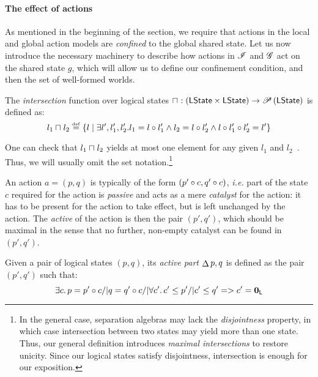 \paragraph{The effect of actions} As mentioned in the beginning of the
section, we require that actions in the local and global action models
are \emph{confined} to the global shared state.  Let us now introduce
the necessary machinery to describe how actions in $\mathscr{I}$ and $\mathscr{G}$
act on the shared state $g$, which will allow us to define our
confinement condition, and then the set of well-formed worlds.

\begin{definition}[Intersection]
The \emph{intersection} function over logical states 
$
\sqcap_{} : \left(\textsf{LState} \times \textsf{LState} \right) \rightarrow \mathscr{P}\left(\textsf{LState} \right)
$
is defined as:
\[
l_1 \sqcap_{} l_2 \mathrel{\stackrel{\smash{\scriptscriptstyle{\mathrm{def}}}}{=}} 
\left\{ 
l  \mid
\exists l', l_1', l_2'.\,\! l_1 = l \circ l_1' \land l_2 = l \circ l_2' \land l \circ l_1' \circ l_2' = l'
\right\}
\]
\end{definition}

One can check that $l_1\sqcap_{} l_2$ yields at most one element for any
given $l_1$ and $l_2$~\cite{colosl-tr14}. Thus, we will usually omit
the set notation.\footnote{In the general case, separation algebras
  may lack the \emph{disjointness} property, in which case
  intersection between two states may yield more than one state. Thus,
  our general definition introduces \emph{maximal intersections} to
  restore unicity. Since our logical states satisfy disjointness,
  intersection is enough for our exposition.}

An action $a = (p, q)$ is typically of the form $(p'\circ c,
q'\circ c)$, \textit{i.e.} part of the state $c$ required for
the action is \emph{passive} and acts as a mere \emph{catalyst} for
the action: it has to be present for the action to take effect, but is
left unchanged by the action. The \emph{active} of the action is then
the pair $(p',q')$, which should be maximal in the sense that no
further, non-empty catalyst can be found in $(p',q')$.

\begin{definition}
  Given a pair of logical states $(p, q)$, its \emph{active part}
  $\mathop{\Delta} p,q$ is defined as the pair $(p', q')$ such that:
  \[
  \exists c.\, p = p' \circ c /| q = q' \circ c /| \forall c'.\, c'\leq p' /|
  c'\leq q' => c' = \mathbf{0}_{\textsf{L}}
  \]
\end{definition}

